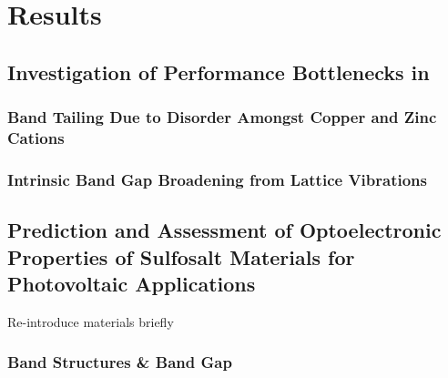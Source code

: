 \chapter{Results}
\section{Investigation of Performance Bottlenecks in \CZTS}
\subsection{Band Tailing Due to Disorder Amongst Copper and Zinc Cations}
\subsection{Intrinsic Band Gap Broadening from Lattice Vibrations}
 
\section{Prediction and Assessment of Optoelectronic Properties of Sulfosalt Materials for Photovoltaic Applications}
Re-introduce materials briefly
\subsection{Band Structures \& Band Gap}